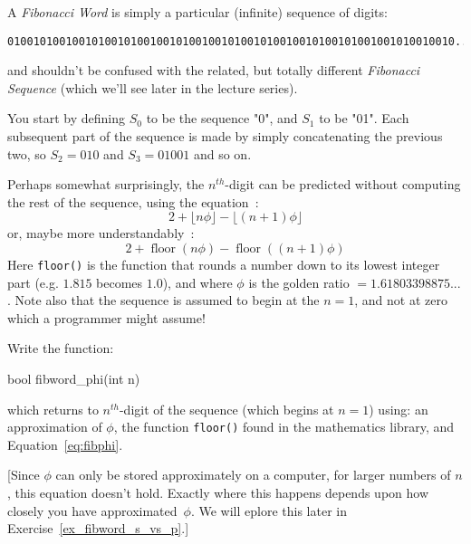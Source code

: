 \label{sec:fibword_phi}



A {\em Fibonacci Word} is simply a particular (infinite) sequence of digits:
\begin{verbatim}
010010100100101001010010010100100101001010010010100101001001010010010...
\end{verbatim}
and shouldn't be confused with the related, but totally different {\em Fibonacci Sequence} (which we'll see later in the lecture series).

You start by defining $S_0$ to be the sequence "0", and $S_1$ to be 
"01". Each subsequent part of the sequence is made by simply concatenating
the previous two, so $S_2 = 010$ and $S_3 = 01001$ and so on.

Perhaps somewhat surprisingly, the $n^{th}$-digit can be
predicted without computing the rest of the sequence, using the equation~:
\begin{equation}
\label{eq:fibphi_math}
2 + \lfloor n \phi \rfloor - \lfloor (n+1) \phi \rfloor
\end{equation}
or, maybe more understandably~:
\begin{equation}
\label{eq:fibphi}
2 + \operatorname{floor}(n \phi) - \operatorname{floor}((n+1) \phi)
\end{equation}
Here \verb^floor()^ is the function that
rounds a number down to its lowest integer part (e.g. $1.815$ becomes
$1.0$), and where $\phi$ is the golden ratio $=1.61803398875...$.
Note also that the sequence is assumed to begin at the $n=1$, and not 
at zero which a programmer might assume!

\begin{exercise}
\label{ex:fibword_phi}
Write the function:
\begin{codesnippet}
bool fibword_phi(int n)
\end{codesnippet}
which returns to $n^{th}$-digit of the sequence (which begins at $n=1$)
using: an approximation of $\phi$, the function \verb^floor()^ found in 
the mathematics library, and Equation~\ref{eq:fibphi}.
\end{exercise}

[Since $\phi$ can only be stored approximately on a computer,
for larger numbers of $n$, this equation doesn't hold. Exactly
where this happens depends upon how closely you have approximated~$\phi$.
We will eplore this later in Exercise~\ref{ex_fibword_s_vs_p}.]
